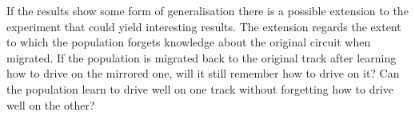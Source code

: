 If the results show some form of generalisation there is a possible extension to the experiment that could yield interesting results. The extension regards the extent to which the population forgets knowledge about the original circuit when migrated. If the population is migrated back to the original track after learning how to drive on the mirrored one, will it still remember how to drive on it? Can the population learn to drive well on one track without forgetting how to drive well on the other?
